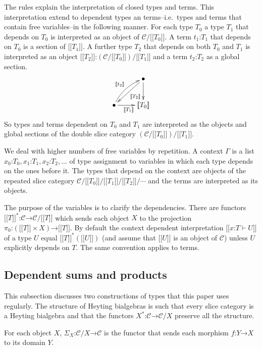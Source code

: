 \documentclass{amsart}
\theoremstyle{plain}
\theoremstyle{definition}
\newcommand\cat\mathcal
\newcommand\ri{^*}
\newcommand\of{\mathord:}
\renewcommand\to{\mathord\rightarrow}
\newcommand\db[1]{{[\![}#1{]\!]}}
\begin{document}
The rules explain the interpretation of closed types and terms. This interpretation extend to dependent types an terms--i.e.\ types and terms that contain free variables--in the following manner. For each type $T_0$ a type $T_1$ that depends on $T_0$ is interpreted as an object of $\cat C/\db{T_0}$. A term $t_1\of T_1$ that depends on $T_0$ is a section of $\db{T_1}$. A further type $T_2$ that depends on both $T_0$ and $T_1$ is interpreted as an object $\db{T_2}\of(\cat C/\db{T_0})/\db{T_1}$ and a term $t_2\of T_2$ as a global section.
\[\xymatrix{
& \bullet\ar[dl]^{\db{T_2}}\ar[d]\\ 
\bullet\ar[r]_{\db{T_1}}\ar@/^/[ur]^{\db{t_2}} & \db{T_0}
}\]
So types and terms dependent on $T_0$ and $T_1$ are interpreted as the objects and global sections of the double slice category $(\cat C/\db{T_0})/\db{T_1}$.

We deal with higher numbers of free variables by repetition. A context $\Gamma$ is a list $x_0\of T_0,x_1\of T_1,x_2\of T_2,\dots$ of type assignment to variables in which each type depends on the ones before it. The types that depend on the context are objects of the repeated slice category $\cat C/\db{T_0}/\db{T_1}/\db{T_2}/\dotsm$ and the terms are interpreted as its objects. 

The purpose of the variables is to clarify the dependencies. There are functors $\db T\ri\of\cat C\to \cat C/\db T$ which sends each object $X$ to the projection $\pi_0\of(\db T\times X)\to \db T$. By default the context dependent interpretation $\db{x\of T\vdash U}$ of a type $U$ equal $\db T\ri(\db U)$ (and assume that $\db U$ is an object of $\cat C$) unless $U$ explicitly depends on $T$. The same convention applies to terms.

\subsection{Dependent sums and products}
This subsection discusses two constructions of types that this paper uses regularly. The structure of Heyting bialgebras is such that every slice category is a Heyting bialgebra and that the functors $X\ri\of\cat C\to\cat C/X$ preserve all the structure.

\newcommand\dsum{\Sigma_}
For each object $X$, $\dsum X\of\cat C/X\to \cat C$ is the functor that sends each morphism $f\of Y\to X$ to its domain $Y$.
\end{document}
